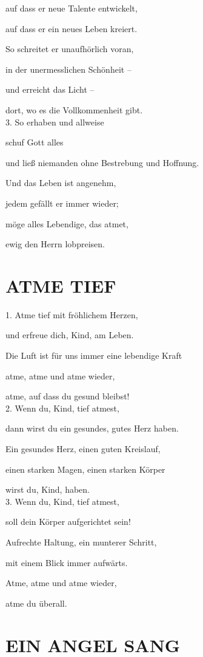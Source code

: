 \documentclass[11pt,a5paper,twoside]{article}
\begin{document}
auf dass er neue Talente entwickelt,

auf dass er ein neues Leben kreiert. 

So schreitet er unaufhörlich voran,

in der unermesslichen Schönheit --

und erreicht das Licht --

dort, wo es die Vollkommenheit gibt. \\

3. So erhaben und allweise

schuf Gott alles

und ließ niemanden ohne Bestrebung und Hoffnung.

Und das Leben ist angenehm,

jedem gefällt er immer wieder;

möge alles Lebendige, das atmet,

ewig den Herrn lobpreisen. 


\section[Atme Tief]{ATME TIEF}

1. Atme tief mit fröhlichem Herzen,

und erfreue dich, Kind, am Leben.

Die Luft ist für uns immer eine lebendige Kraft

atme, atme und atme wieder,

atme, auf dass du gesund bleibst!\\

2. Wenn du, Kind, tief atmest,

dann wirst du ein gesundes, gutes Herz haben.

Ein gesundes Herz, einen guten Kreislauf,

einen starken Magen, einen starken Körper

wirst du, Kind, haben.\\

3. Wenn du, Kind, tief atmest,

soll dein Körper aufgerichtet sein!

Aufrechte Haltung, ein munterer Schritt,

mit einem Blick immer aufwärts.

Atme, atme und atme wieder,

atme du überall.


\section[Ein Angel sang]{EIN ANGEL SANG}
\end{document}
